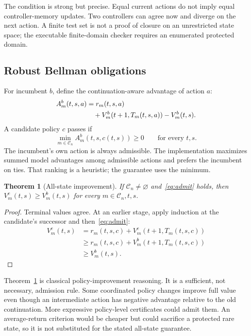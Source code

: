 \documentclass[10pt,twocolumn]{article}
\newtheorem{theorem}{Theorem}
\newcommand{\C}{\mathcal C}
\begin{document}
The condition is strong but precise. Equal current actions do not imply equal
controller-memory updates. Two controllers can agree now and diverge on the next
action. A finite test set is not a proof of closure on an unrestricted state space;
the executable finite-domain checker requires an enumerated protected domain.

\subsection{Robust Bellman obligations}
For incumbent $b$, define the continuation-aware advantage of action $a$:
\begin{align}
 A_m^b(t,s,a)&=r_m(t,s,a)\notag\\
 &\quad+V_m^b(t+1,T_m(t,s,a))-V_m^b(t,s).
\end{align}
A candidate policy $c$ passes if
\begin{equation}
 \min_{m\in\C_n} A_m^b(t,s,c(t,s))\geq0
 \qquad\text{for every }t,s.\label{eq:admit}
\end{equation}
The incumbent's own action is always admissible. The implementation maximizes
summed model advantages among admissible actions and prefers the incumbent on
ties. That ranking is a heuristic; the guarantee uses the minimum.

\begin{theorem}[All-state improvement]\label{thm:improve}
If $\C_n\ne\varnothing$ and~\eqref{eq:admit} holds, then
$V_m^c(t,s)\geq V_m^b(t,s)$ for every $m\in\C_n,t,s$.
\end{theorem}
\begin{proof}
Terminal values agree. At an earlier stage, apply induction at the candidate's
successor and then~\eqref{eq:admit}:
\begin{align*}
 V_m^c(t,s)&=r_m(t,s,c)+V_m^c(t+1,T_m(t,s,c))\\
 &\geq r_m(t,s,c)+V_m^b(t+1,T_m(t,s,c))\\
 &\geq V_m^b(t,s).
\end{align*}
\end{proof}

Theorem~\ref{thm:improve} is classical policy-improvement reasoning. It is a
sufficient, not necessary, admission rule. Some coordinated policy changes improve
full value even though an intermediate action has negative advantage relative to
the old continuation. More expressive policy-level certificates could admit them.
An average-return criterion would be cheaper but could sacrifice a protected rare
state, so it is not substituted for the stated all-state guarantee.
\end{document}
